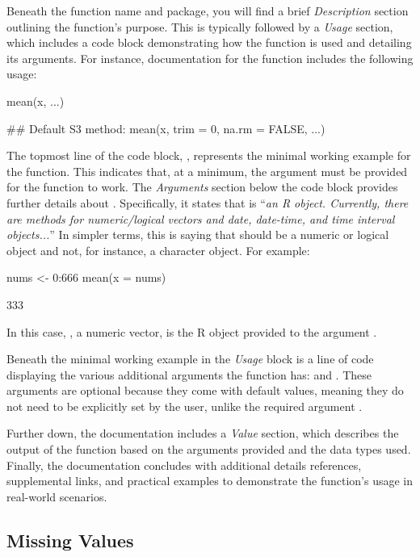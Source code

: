 Beneath the function name and package, you will find a brief \textit{Description} section outlining the function’s purpose. This is typically followed by a \textit{Usage} section, which includes a code block demonstrating how the function is used and detailing its arguments. For instance, documentation for the  function includes the following usage:

\begin{inR}
mean(x, ...)

## Default S3 method:
mean(x, trim = 0, na.rm = FALSE, ...)
\end{inR}

\vspace{1em}
\noindent The topmost line of the code block, , represents the minimal working example for the function. This indicates that, at a minimum, the argument  must be provided for the function to work. The \textit{Arguments} section below the code block provides further details about . Specifically, it states that  is ``\textit{an R object. Currently, there are methods for numeric/logical vectors and date, date-time, and time interval objects...}'' In simpler terms, this is saying that  should be a numeric or logical object and not, for instance, a character object. For example:

\begin{inR}
nums <- 0:666
mean(x = nums)
\end{inR}
\begin{outR}
[1] 333
\end{outR}

\noindent In this case, , a numeric vector, is the R object provided to the argument . 

Beneath the minimal working example in the \textit{Usage} block is a line of code displaying the various additional arguments the function has:  and . These arguments are optional because they come with default values, meaning they do not need to be explicitly set by the user, unlike the required argument .

Further down, the documentation includes a \textit{Value} section, which describes the output of the function based on the arguments provided and the data types used. Finally, the documentation concludes with additional details references, supplemental links, and practical examples to demonstrate the function's usage in real-world scenarios.

\subsection{Missing Values}

